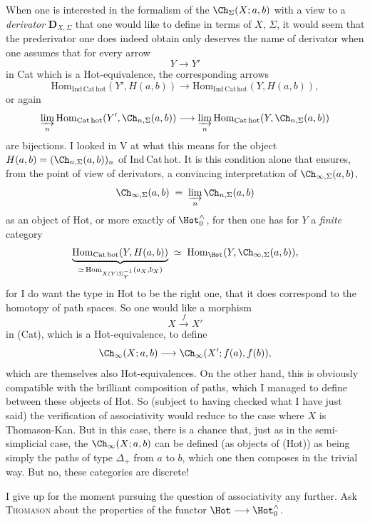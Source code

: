 When one is interested in the formalism of the $\Ch_\Sigma(X;a,b)$ with a view to a \textit{derivator} $\mathbf{D}_{X,\Sigma}$ that one would like to define in terms of $X$, $\Sigma$, it would seem that the prederivator one does indeed obtain only deserves the name of derivator when one assumes that for every arrow
\[ Y\longrightarrow Y' \]
in Cat which is a Hot-equivalence, the corresponding arrows
\[ \mathrm{Hom}_{\mathrm{Ind\,Cat\,hot}}(Y',H(a,b)) \longrightarrow \mathrm{Hom}_{\mathrm{Ind\,Cat\,hot}}(Y,H(a,b)), \]
or again
\[ \varinjlim_n \mathrm{Hom}_{\mathrm{Cat\,hot}}(Y',\Ch_{n,\Sigma}(a,b)) \longrightarrow \varinjlim_n \mathrm{Hom}_{\mathrm{Cat\,hot}}(Y,\Ch_{n,\Sigma}(a,b)) \]
are bijections. I looked in V at what this means for the object $H(a,b) = (\Ch_{n,\Sigma}(a,b))_n$ of Ind\,Cat\,hot. It is this condition alone that ensures, from the point of view of derivators, a convincing interpretation of $\Ch_{\infty,\Sigma}(a,b)$,
\[ \Ch_{\infty,\Sigma}(a,b) \;=\; \varinjlim_n \Ch_{n,\Sigma}(a,b) \]
as an object of Hot, or more exactly of $\Hot^{\wedge}_{0}$, for then one has for $Y$ a \textit{finite} category
\[ \underbrace{\mathrm{Hom}_{\mathrm{Cat\,hot}}(Y,H(a,b))}_{\simeq\,\mathrm{Hom}_{X(Y)\Sigma_Y^{-1}}(a_X,b_X)} \;\simeq\; \mathrm{Hom}_{\Hot}(Y,\Ch_{\infty,\Sigma}(a,b)), \]
for I do want the type in Hot to be the right one, that it does correspond to the homotopy of path spaces. So one would like a morphism
\[ X\xrightarrow{\;f\;}X' \]
in (Cat), which is a Hot-equivalence, to define
\[ \Ch_\infty(X;a,b) \longrightarrow \Ch_\infty(X';f(a),f(b)), \]
which are themselves also Hot-equivalences. On the other hand, this is obviously compatible with the brilliant composition of paths, which I managed to define between these objects of Hot. So (subject to having checked what I have just said) the verification of associativity would reduce to the case where $X$ is Thomason-Kan. But in this case, there is a chance that, just as in the semi-simplicial case, the $\Ch_\infty(X;a,b)$ can be defined (as objects of (Hot)) as being simply the paths of type $\Delta_+$ from $a$ to $b$, which one then composes in the trivial way. But no, these categories are discrete! %

I give up for the moment pursuing the question of associativity any further. Ask \textsc{Thomason} about the properties of the functor $\Hot\longrightarrow\Hot^{\wedge}_{0}$.

\clearpage
{}

